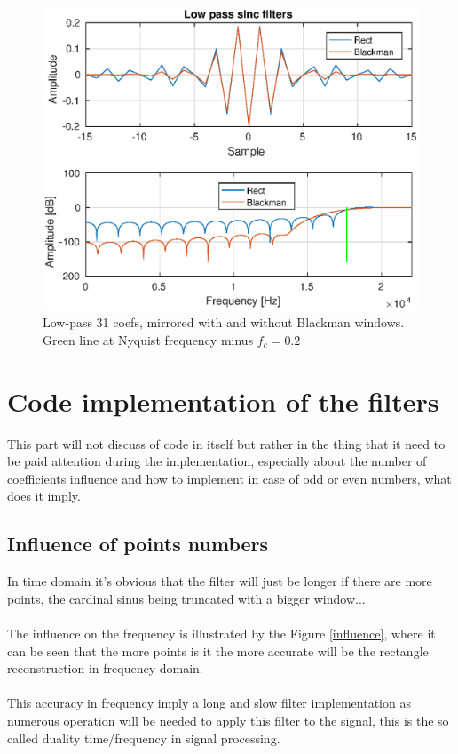 \documentclass[twoside,twocolumn]{article}
\begin{document}
\begin{figure}[h!]
	\centering
	\includegraphics[scale=0.5]{./images/mirrored.eps}
	\caption{Low-pass 31 coefs, mirrored with and without Blackman windows. Green line at Nyquist frequency minus $f_c=0.2$}
	\label{mirrored}
\end{figure}


\section{Code implementation of the filters}
\label{sec:code}
This part will not discuss of code in itself but rather in the thing that it need to be paid attention during the implementation, especially about the number of coefficients influence and how to implement in case of odd or even numbers, what does it imply.

\subsection{Influence of points numbers}
\label{influ}
 In time domain it's obvious that the filter will just be longer if there are more points, the cardinal sinus being truncated with a bigger window...\\ \\
The influence on the frequency is illustrated by the Figure \ref{influence}, where it can be seen that the more points is it the more accurate will be the rectangle reconstruction in frequency domain.\\ \\ This accuracy in frequency imply a long and slow filter implementation as numerous operation will be needed to apply this filter to the signal, this is the so called duality time/frequency in signal processing.
\end{document}

